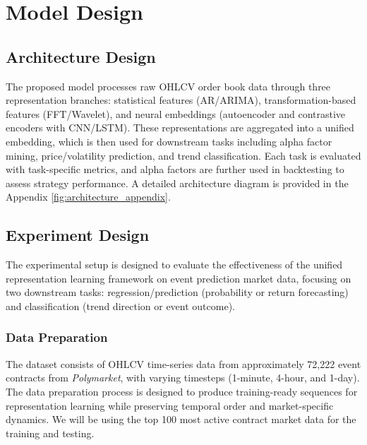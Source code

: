 \chapter{Model Design}

\section{Architecture Design}

The proposed model processes raw OHLCV order book data through three representation branches: statistical features (AR/ARIMA), transformation-based features (FFT/Wavelet), and neural embeddings (autoencoder and contrastive encoders with CNN/LSTM). These representations are aggregated into a unified embedding, which is then used for downstream tasks including alpha factor mining, price/volatility prediction, and trend classification. Each task is evaluated with task-specific metrics, and alpha factors are further used in backtesting to assess strategy performance. A detailed architecture diagram is provided in the Appendix \ref{fig:architecture_appendix}.


\section{Experiment Design}

The experimental setup is designed to evaluate the effectiveness of the unified representation learning framework on event prediction market data, focusing on two downstream tasks: regression/prediction (probability or return forecasting) and classification (trend direction or event outcome).


\subsection*{Data Preparation}

The dataset consists of OHLCV time-series data from approximately 72,222 event contracts from \textit{Polymarket}, with varying timesteps (1-minute, 4-hour, and 1-day). The data preparation process is designed to produce training-ready sequences for representation learning while preserving temporal order and market-specific dynamics. We will be using the top 100 most active contract market data for the training and testing.

